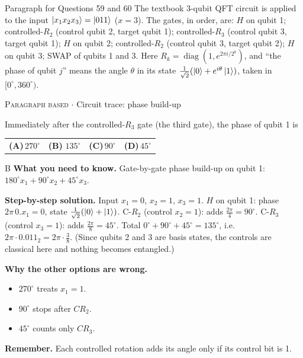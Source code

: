 \documentclass[11pt,a4paper]{article}
\newcommand{\optlabel}[1]{\textbf{(#1)}}
\newcommand{\correctlabel}[1]{\textcolor{okgreen}{\textbf{(#1)}\,\ding{51}}}
\newenvironment{qitem}[1]{\begin{list}{}{\setlength{\leftmargin}{3.3em}\setlength{\labelwidth}{3.1em}%
  \setlength{\labelsep}{0.2em}\setlength{\topsep}{3pt}\setlength{\parsep}{3pt}}\item[\textbf{Q.#1}\hfill]}{\end{list}}
\newcommand{\qsep}{\par\vspace{2pt}{\color{black!15}\hrule}\vspace{4pt}}
\newcommand{\qmeta}[2]{{\footnotesize\color{black!60}\textsc{#1} \;$\cdot$\; #2}\par}
\begin{document}
\begin{passagebox}{Paragraph for Questions 59 and 60}
The textbook 3-qubit QFT circuit is applied to the input $\ket{x_1x_2x_3} = \ket{011}$ ($x = 3$). The gates, in order, are:
$H$ on qubit 1; controlled-$R_2$ (control qubit 2, target qubit 1); controlled-$R_3$ (control qubit 3, target qubit 1);
$H$ on qubit 2; controlled-$R_2$ (control qubit 3, target qubit 2); $H$ on qubit 3; SWAP of qubits 1 and 3.
Here $R_k = \operatorname{diag}(1, e^{2\pi i/2^k})$, and ``the phase of qubit $j$'' means the angle $\theta$ in its state
$\frac{1}{\sqrt2}(\ket0 + e^{i\theta}\ket1)$, taken in $[0^\circ, 360^\circ)$.
\end{passagebox}
\begin{qitem}{59}
\qmeta{Paragraph based}{Circuit trace: phase build-up}
Immediately after the controlled-$R_3$ gate (the third gate), the phase of qubit 1 is
\par\smallskip\noindent\begin{tabularx}{\linewidth}{@{}*{4}{L}@{}}
\optlabel{A}\,$270^\circ$ & \correctlabel{B}\,$135^\circ$ & \optlabel{C}\,$90^\circ$ & \optlabel{D}\,$45^\circ$
\end{tabularx}
\end{qitem}
\begin{solbox}{B}
\textbf{\color{brand}What you need to know.} Gate-by-gate phase build-up on qubit 1: $180^\circ x_1 + 90^\circ x_2 + 45^\circ x_3$.

\textbf{\color{brand}Step-by-step solution.} Input $x_1 = 0$, $x_2 = 1$, $x_3 = 1$.
$H$ on qubit 1: phase $2\pi\,0.x_1 = 0$, state $\frac{1}{\sqrt2}(\ket0 + \ket1)$.
C-$R_2$ (control $x_2 = 1$): adds $\frac{2\pi}{4} = 90^\circ$. C-$R_3$ (control $x_3 = 1$): adds $\frac{2\pi}{8} = 45^\circ$.
Total $0^\circ + 90^\circ + 45^\circ = 135^\circ$, i.e.\ $2\pi\cdot 0.011_2 = 2\pi\cdot\frac38$. (Since qubits 2 and 3 are basis states,
the controls are classical here and nothing becomes entangled.)

\textbf{\color{brand}Why the other options are wrong.}
\begin{itemize}[leftmargin=2.4em, itemsep=1pt, topsep=2pt]
\item[\textbf{(A)}] $270^\circ$ treats $x_1 = 1$.
\item[\textbf{(C)}] $90^\circ$ stops after $CR_2$.
\item[\textbf{(D)}] $45^\circ$ counts only $CR_3$.
\end{itemize}
\textbf{\color{brand}Remember.} Each controlled rotation adds its angle only if its control bit is 1.
\end{solbox}
\qsep
\end{document}
